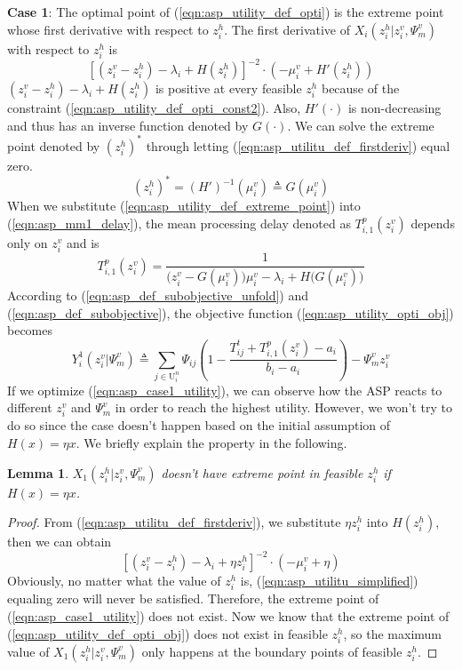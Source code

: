 \documentclass[conference]{IEEEtran}
\newtheorem{lemma}{Lemma}
\begin{document}
\textbf{Case 1}: The optimal point of (\ref{eqn:asp_utility_def_opti}) is the extreme point whose first derivative with respect to $z_i^h$. The first derivative of $X_i(z_i^h|z_i^v,\Psi_m^v)$ with respect to $z_i^h$ is
\begin{equation} \label{eqn:asp_utilitu_def_firstderiv}
[(z_i^v - z_i^h) - \lambda_i + H(z_i^h)]^{-2} \cdot (-\mu_i^v + H'(z_i^h))
\end{equation}
$(z_i^v - z_i^h) - \lambda_i + H(z_i^h)$ is positive at every feasible $z_i^h$ because of the constraint (\ref{eqn:asp_utility_def_opti_const2}). Also, $H'(\cdot)$ is non-decreasing and thus has an inverse function denoted by $G(\cdot)$. We can solve the extreme point denoted by $(z_i^h)^*$ through letting (\ref{eqn:asp_utilitu_def_firstderiv}) equal zero. 
\begin{equation} \label{eqn:asp_utility_def_extreme_point}
(z_i^h)^* = (H')^{-1}(\mu_i^v) \triangleq G(\mu_i^v)
\end{equation}
When we substitute (\ref{eqn:asp_utility_def_extreme_point}) into (\ref{eqn:asp_mm1_delay}), the mean processing delay denoted as $T_{i,1}^p(z_i^v)$ depends only on $z_i^v$ and is 
\begin{equation}
T_{i,1}^p(z_i^v) = \frac{1}{\big(z_i^v - G(\mu_i^v)\big)\mu_i^v - \lambda_i + H\big(G(\mu_i^v)\big)}
\end{equation}
According to (\ref{eqn:asp_def_subobjective_unfold}) and (\ref{eqn:asp_def_subobjective}), the objective function (\ref{eqn:asp_utility_opti_obj}) becomes
\begin{equation}\label{eqn:asp_case1_utility}
Y_i^1(z_i^v|\Psi_m^v) \triangleq \sum_{j \in \mathrm{U}_i^n}\Psi_{ij}(1-\frac{T_{ij}^t + T_{i,1}^p(z_i^v)-a_i}{b_i-a_i}) - \Psi_m^vz_i^v
\end{equation}
If we optimize (\ref{eqn:asp_case1_utility}), we can observe how the ASP reacts to different $z_i^v$ and $\Psi_m^v$ in order to reach the highest utility. However, we won't try to do so since the case doesn't happen based on the initial assumption of $H(x) = \eta{x}$. We briefly explain the property in the following.
\begin{lemma} \label{lemma:asp_case1_not_exist}
$X_1(z_i^h|z_i^v,\Psi_m^v)$ doesn't have extreme point in feasible $z_i^h$ if $H(x) = \eta{x}$.
\end{lemma}
\begin{proof}  
From (\ref{eqn:asp_utilitu_def_firstderiv}),  we substitute $\eta{z_i^h}$ into $H(z_i^h)$, then we can obtain
\begin{equation} \label{eqn:asp_utilitu_simplified}
[(z_i^v - z_i^h) - \lambda_i + \eta{z_i^h}]^{-2} \cdot (-\mu_i^v + \eta)
\end{equation}
Obviously, no matter what the value of $z_i^h$ is, (\ref{eqn:asp_utilitu_simplified}) equaling zero will never be satisfied. Therefore, the extreme point of (\ref{eqn:asp_case1_utility}) does not exist.
Now we know that the extreme point of (\ref{eqn:asp_utility_def_opti_obj}) does not exist in feasible $z_i^h$, so the maximum value of $X_1(z_i^h|z_i^v,\Psi_m^v)$ only happens at the boundary points of feasible $z_i^h$.
\qedhere
\end{proof}
\end{document}
